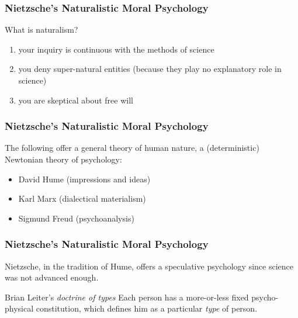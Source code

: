 \documentclass[xcolor=dvipsnames]{beamer}
\begin{document}
\begin{frame}
  \frametitle{Nietzsche's Naturalistic Moral Psychology}
  What is naturalism?
  \begin{enumerate}
  \item your inquiry is continuous with the methods of science
  \item you deny super-natural entities (because they play no
    explanatory role in science)
  \item you are skeptical about free will 
  \end{enumerate}
\end{frame}

\begin{frame}
  \frametitle{Nietzsche's Naturalistic Moral Psychology}
  The following offer a general theory of human nature, a
  (deterministic) Newtonian theory of psychology:
  \begin{itemize}
  \item David Hume (impressions and ideas)
  \item Karl Marx (dialectical materialism)
  \item Sigmund Freud (psychoanalysis)
  \end{itemize}
\end{frame}

\begin{frame}
  \frametitle{Nietzsche's Naturalistic Moral Psychology}
Nietzsche, in the tradition of Hume, offers a speculative psychology
since science was not advanced enough.
  \begin{block}{  Brian Leiter's \emph{doctrine of types}}
    Each person has a more-or-less fixed psycho-physical constitution,
    which defines him as a particular \emph{type} of person.
  \end{block}
\end{frame}
\end{document}
